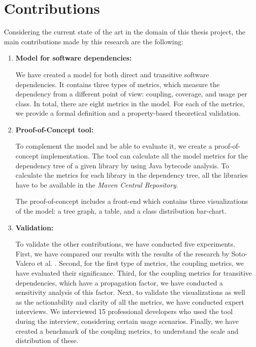 \section{Contributions}
Considering the current state of the art in the domain of this thesis project, the main contributions made by this research are the following:

\begin{enumerate}
  \item \textbf{Model for software dependencies:}

    We have created a model for both direct and transitive software dependencies. It contains three types of metrics, which measure the dependency from a different point of view: coupling, coverage, and usage per class. In total, there are eight metrics in the model. For each of the metrics, we provide a formal definition and a property-based theoretical validation.

  	\item \textbf{Proof-of-Concept tool:}

    To complement the model and be able to evaluate it, we create a proof-of-concept implementation. The tool can calculate all the model metrics for the dependency tree of a given library by using Java bytecode analysis. To calculate the metrics for each library in the dependency tree, all the libraries have to be available in the \textit{Maven Central Repository}.

    The proof-of-concept includes a front-end which contains three visualizations of the model: a tree graph, a table, and a class distribution bar-chart.

    \item \textbf{Validation:}

    To validate the other contributions, we have conducted five experiments. First, we have compared our results with the results of the research by Soto-Valero et al. \cite{soto2020comprehensive}. Second, for the first type of metrics, the coupling metrics, we have evaluated their significance. Third, for the coupling metrics for transitive dependencies, which have a propagation factor, we have conducted a sensitivity analysis of this factor. Next, to validate the visualizations as well as the actionability and clarity of all the metrics, we have conducted expert interviews. We interviewed 15 professional developers who used the tool during the interview, considering certain usage scenarios. Finally, we have created a benchmark of the coupling metrics, to understand the scale and distribution of these.
    
\end{enumerate}

